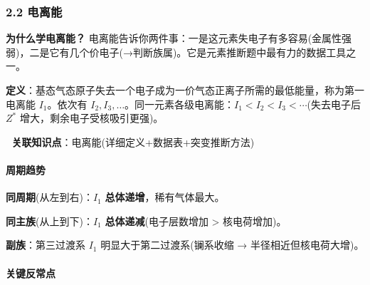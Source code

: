 \subsubsection{2.2 电离能}\label{ux7535ux79bbux80fd}

\textbf{为什么学电离能？} 电离能告诉你两件事：一是这元素失电子有多容易(金属性强弱)，二是它有几个价电子(→判断族属)。它是元素推断题中最有力的数据工具之一。

\textbf{定义}：基态气态原子失去一个电子成为一价气态正离子所需的最低能量，称为第一电离能 \(I_1\)。依次有 \(I_2, I_3, \dots\)。同一元素各级电离能：\(I_1 < I_2 < I_3 < \cdots\)(失去电子后 \(Z^*\) 增大，剩余电子受核吸引更强)。

🔗 \textbf{关联知识点}：电离能(详细定义+数据表+突变推断方法)

\paragraph{周期趋势}\label{ux5468ux671fux8d8bux52bf}

\textbf{同周期}(从左到右)：\(I_1\) \textbf{总体递增}，稀有气体最大。

\textbf{同主族}(从上到下)：\(I_1\) \textbf{总体递减}(电子层数增加 \textgreater{} 核电荷增加)。

\textbf{副族}：第三过渡系 \(I_1\) 明显大于第二过渡系(镧系收缩 → 半径相近但核电荷大增)。

\paragraph{关键反常点}\label{ux5173ux952eux53cdux5e38ux70b9}

